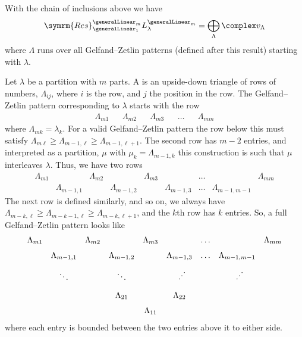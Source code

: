 \documentclass[fleqn]{NotesClass}
\newcommand{\Res}{\symrm{Res}}
\begin{document}
    \begin{crl}{}{}
        With the chain of inclusions above we have
        \begin{equation}
            \Res^{\generalLinear_m}_{\generalLinear_1} L_\lambda^{\generalLinear_m} = \bigoplus_\Lambda \complex v_\Lambda
        \end{equation}
        where \(\Lambda\) runs over all Gelfand--Zetlin patterns (defined after this result) starting with \(\lambda\).
    \end{crl}
    
    Let \(\lambda\) be a partition with \(m\) parts.
    A  is an upside-down triangle of rows of numbers, \(\Lambda_{ij}\), where \(i\) is the row, and \(j\) the position in the row.
    The Gelfand--Zetlin pattern corresponding to \(\lambda\) starts with the row
    \begin{equation}
        \begin{array}{ccccccccc}
            \Lambda_{m1} && \Lambda_{m2} && \Lambda_{m3} && \dotso && \Lambda_{mm}
        \end{array}
    \end{equation}
    where \(\Lambda_{mk} = \lambda_k\).
    For a valid Gelfand--Zetlin pattern the row below this must satisfy \(\Lambda_{m\ell} \ge \Lambda_{m-1,\ell} \ge \Lambda_{m-1,\ell+1}\).
    The second row has \(m - 2\) entries, and interpreted as a partition, \(\mu\) with \(\mu_k = \Lambda_{m-1,k}\) this construction is such that \(\mu\) interleaves \(\lambda\).
    Thus, we have two rows
    \begin{equation}
        \begin{array}{ccccccccc}
            \Lambda_{m1} && \Lambda_{m2} && \Lambda_{m3} && \dotso && \Lambda_{mm}\\[1.5ex]
            & \Lambda_{m-1,1} && \Lambda_{m-1,2} && \Lambda_{m-1,3} & \dotso & \Lambda_{m-1,m-1} &
        \end{array}
    \end{equation}
    The next row is defined similarly, and so on, we always have \(\Lambda_{m-k,\ell} \ge \Lambda_{m-k-1,\ell} \ge \Lambda_{m-k,\ell+1}\), and the \(k\)th row has \(k\) entries.
    So, a full Gelfand--Zetlin pattern looks like 
    \begin{equation}
        \begin{array}{ccccccccc}
            \Lambda_{m1} && \Lambda_{m2} && \Lambda_{m3} && \dotso && \Lambda_{mm}\\[1.5ex]
            & \Lambda_{m-1,1} && \Lambda_{m-1,2} && \Lambda_{m-1,3} & \dotso & \Lambda_{m-1,m-1} &\\[2ex]
            & \ddots && \ddots && \rotatebox{90}{\(\ddots\)} &  & \rotatebox{90}{\(\ddots\)} &\\[2ex]
            &&& \Lambda_{21} && \Lambda_{22} &&&\\[1.5ex]
            &&&& \Lambda_{11} &&&&
        \end{array}
    \end{equation}
    where each entry is bounded between the two entries above it to either side.
    
\end{document}

